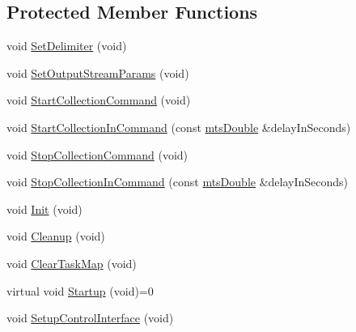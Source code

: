 \subsection*{Protected Member Functions}
\begin{DoxyCompactItemize}
\item 
void \hyperlink{classmts_collector_base_a8f7a140dc2f96646b191680697fc341a}{Set\+Delimiter} (void)
\item 
void \hyperlink{classmts_collector_base_a12e7d75810e849d08f81b22ba15b2651}{Set\+Output\+Stream\+Params} (void)
\item 
void \hyperlink{classmts_collector_base_a9710912f3c7a2a0e27210ec3e4031836}{Start\+Collection\+Command} (void)
\item 
void \hyperlink{classmts_collector_base_a52b9537fdb6632e1efa8dc5e17aad013}{Start\+Collection\+In\+Command} (const \hyperlink{mts_generic_object_proxy_8h_a31e76b0190a8d3f9838626cd7b47bd75}{mts\+Double} \&delay\+In\+Seconds)
\item 
void \hyperlink{classmts_collector_base_ab1b32657c9ea39cc657d562c5b1be802}{Stop\+Collection\+Command} (void)
\item 
void \hyperlink{classmts_collector_base_ab99c5d1e2cd381ead225ac57b2ec620d}{Stop\+Collection\+In\+Command} (const \hyperlink{mts_generic_object_proxy_8h_a31e76b0190a8d3f9838626cd7b47bd75}{mts\+Double} \&delay\+In\+Seconds)
\item 
void \hyperlink{classmts_collector_base_a7faf69da541094f4ba045165e812b7df}{Init} (void)
\item 
void \hyperlink{classmts_collector_base_a1ec6f11c284cf013ab3cf7556cd04896}{Cleanup} (void)
\item 
void \hyperlink{classmts_collector_base_a9488170795470dd8ca10ae14179e9a6f}{Clear\+Task\+Map} (void)
\item 
virtual void \hyperlink{classmts_collector_base_a7e3ca6f1f52519df43dc1d70202968f2}{Startup} (void)=0
\item 
void \hyperlink{classmts_collector_base_a8cec0a5fdf2aa587718f3dacd9e98572}{Setup\+Control\+Interface} (void)
\end{DoxyCompactItemize}
